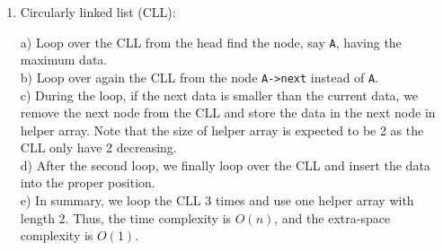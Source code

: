 \documentclass[12pt]{article}
\begin{document}
\begin{enumerate}
\item  Circularly linked list (CLL):\par
    a) Loop over the CLL from the head find the node, say \texttt{A}, having the maximum data.\\
    b) Loop over again the CLL from the node \texttt{A->next} instead of \texttt{A}.\\
    c) During the loop, if the next data is smaller than the current data, we remove the next node from the CLL and store the data in the next node in helper array.
       Note that the size of helper array is expected to be 2 as the CLL only have 2 decreasing.\\
    d) After the second loop, we finally loop over the CLL and insert the data into the proper position.\\
    e) In summary, we loop the CLL 3 times and use one helper array with length 2. Thus, the time complexity is $O(n)$,
       and the extra-space complexity is $O(1)$.

\end{enumerate}
\end{document}
